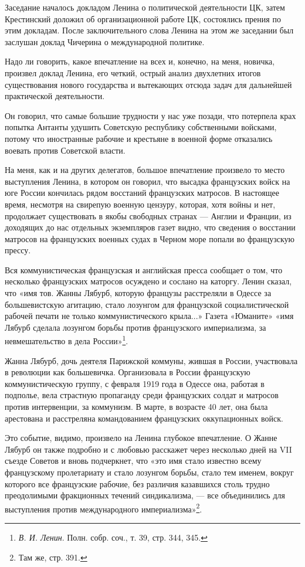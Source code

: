 \documentclass[12pt, a4paper, openany]{book}
\begin{document}
Заседание началось докладом Ленина о политической деятельности ЦК, затем Крестинский доложил об организационной работе ЦК, состоялись прения по этим докладам. После заключительного слова Ленина на этом же заседании был заслушан доклад Чичерина о международной политике.

Надо ли говорить, какое впечатление на всех и, конечно, на меня, новичка, произвел доклад Ленина, его четкий, острый анализ двухлетних итогов существования нового государства и вытекающих отсюда задач для дальнейшей практической деятельности.

Он говорил, что самые большие трудности у нас уже позади, что потерпела крах попытка Антанты удушить Советскую республику собственными войсками, потому что иностранные рабочие и крестьяне в военной форме отказались воевать против Советской власти.

На меня, как и на других делегатов, большое впечатление произвело то место выступления Ленина, в котором он говорил, что высадка французских войск на юге России кончилась рядом восстаний французских матросов. В настоящее время, несмотря на свирепую военную цензуру, которая, хотя войны и нет, продолжает существовать в якобы свободных странах — Англии и Франции, из доходящих до нас отдельных экземпляров газет видно, что сведения о восстании матросов на французских военных судах в Черном море попали во французскую прессу.

Вся коммунистическая французская и английская пресса сообщает о том, что несколько французских матросов осуждено и сослано на каторгу. Ленин сказал, что «имя тов. Жанны Лябурб, которую французы расстреляли в Одессе за большевистскую агитацию, стало лозунгом для французской социалистической рабочей печати не только коммунистического крыла...» Газета «Юманите» «имя Лябурб сделала лозунгом борьбы против французского империализма, за невмешательство в дела России»\footnote{\textit{В. И. Ленин}. Полн. собр. соч., т. 39, стр. 344, 345.}.

Жанна Лябурб, дочь деятеля Парижской коммуны, жившая в России, участвовала в революции как большевичка. Организовала в России французскую коммунистическую группу, с февраля 1919 года в Одессе она, работая в подполье, вела страстную пропаганду среди французских солдат и матросов против интервенции, за коммунизм. В марте, в возрасте 40 лет, она была арестована и расстреляна командованием французских оккупационных войск.

Это событие, видимо, произвело на Ленина глубокое впечатление. О Жанне Лябурб он также подробно и с любовью расскажет через несколько дней на VII съезде Советов и вновь подчеркнет, что «это имя стало известно всему французскому пролетариату и стало лозунгом борьбы, стало тем именем, вокруг которого все французские рабочие, без различия казавшихся столь трудно преодолимыми фракционных течений синдикализма, — все объединились для выступления против международного империализма»\footnote{Там же, стр. 391.}.
\end{document}
